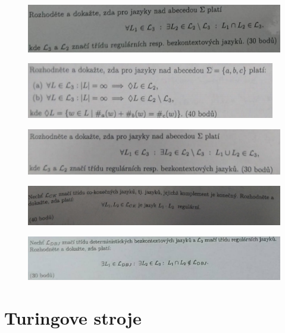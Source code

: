 \documentclass[]{article}
\begin{document}
	\begin{figure}[H]
		\includegraphics[width=\textwidth]{tasks/vlastnosti/task2.png}
	\end{figure}
	
	\begin{figure}[H]
		\includegraphics[width=\textwidth]{tasks/vlastnosti/task3.png}
	\end{figure}


	\begin{figure}[H]
		\includegraphics[width=\textwidth]{tasks/vlastnosti/task4.png}
	\end{figure}
	
	\begin{figure}[H]
		\includegraphics[width=\textwidth]{tasks/vlastnosti/task5.png}
	\end{figure}

	\begin{figure}[H]
		\includegraphics[width=\textwidth]{tasks/vlastnosti/task6.png}
	\end{figure}

	\section{Turingove stroje}
	
\end{document}
